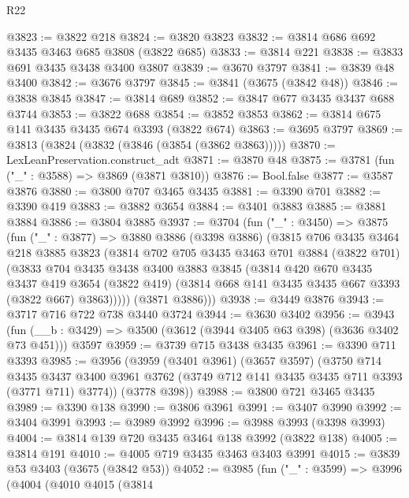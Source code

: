 \begin{lexlean}{R22}
\begin{coremodule}
@3823 := @3822 @218
@3824 := @3820 @3823
@3832 := @3814 @686 @692 @3435 @3463 @685 @3808 (@3822 @685)
@3833 := @3814 @221
@3838 := @3833 @691 @3435 @3438 @3400 @3807
@3839 := @3670 @3797
@3841 := @3839 @48 @3400
@3842 := @3676 @3797
@3845 := @3841 (@3675 (@3842 @48))
@3846 := @3838 @3845
@3847 := @3814 @689
@3852 := @3847 @677 @3435 @3437 @688 @3744
@3853 := @3822 @688
@3854 := @3852 @3853
@3862 := @3814 @675 @141 @3435 @3435 @674 @3393 (@3822 @674)
@3863 := @3695 @3797
@3869 := @3813 (@3824 (@3832 (@3846 (@3854 (@3862 @3863)))))
@3870 := LexLeanPreservation.construct_adt
@3871 := @3870 @48
@3875 := @3781 (fun ("_" : @3588) => @3869 (@3871 @3810))
@3876 := Bool.false
@3877 := @3587 @3876
@3880 := @3800 @707 @3465 @3435
@3881 := @3390 @701
@3882 := @3390 @419
@3883 := @3882 @3654
@3884 := @3401 @3883
@3885 := @3881 @3884
@3886 := @3804 @3885
@3937 := @3704
    (fun ("_" : @3450) =>
    @3875
      (fun ("_" : @3877) =>
      @3880
        @3886
        (@3398 @3886)
        (@3815
          @706
          @3435
          @3464
          @218
          @3885
          @3823
          (@3814
            @702
            @705
            @3435
            @3463
            @701
            @3884
            (@3822 @701)
            (@3833
              @704
              @3435
              @3438
              @3400
              @3883
              @3845
              (@3814
                @420
                @670
                @3435
                @3437
                @419
                @3654
                (@3822 @419)
                (@3814 @668 @141 @3435 @3435 @667 @3393 (@3822 @667) @3863)))))
        (@3871 @3886)))
@3938 := @3449 @3876
@3943 := @3717 @716 @722 @738 @3440 @3724
@3944 := @3630 @3402
@3956 := @3943
    (fun (__b : @3429) => @3500 (@3612 (@3944 @3405 @63 @398) (@3636 @3402 @73 @451)))
    @3597
@3959 := @3739 @715 @3438 @3435
@3961 := @3390 @711 @3393
@3985 := @3956
    (@3959
      (@3401 @3961)
      (@3657 @3597)
      (@3750
        @714
        @3435
        @3437
        @3400
        @3961
        @3762
        (@3749 @712 @141 @3435 @3435 @711 @3393 (@3771 @711) @3774))
      (@3778 @398))
@3988 := @3800 @721 @3465 @3435
@3989 := @3390 @138
@3990 := @3806 @3961
@3991 := @3407 @3990
@3992 := @3404 @3991
@3993 := @3989 @3992
@3996 := @3988 @3993 (@3398 @3993)
@4004 := @3814 @139 @720 @3435 @3464 @138 @3992 (@3822 @138)
@4005 := @3814 @191
@4010 := @4005 @719 @3435 @3463 @3403 @3991
@4015 := @3839 @53 @3403 (@3675 (@3842 @53))
@4052 := @3985
    (fun ("_" : @3599) =>
    @3996
      (@4004
        (@4010
          @4015
          (@3814

\end{coremodule}
\end{lexlean}
